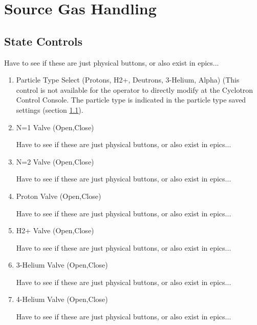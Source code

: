 \documentclass[11pt]{book}		%
\begin{document}
\section{Source Gas Handling}


\subsection{State Controls}

\color{red}
Have to see if these are just physical buttons, or also exist in epics...
\color{black}


\begin{enumerate}
 \item Particle Type Select (Protons, H2+, Deutrons, 3-Helium, Alpha) (This control is not available for the operator to directly modify at the Cyclotron Control Console.  The particle type is indicated in the particle type saved settings (section \ref{}).

\color{red}

\color{black}

 \item N=1 Valve (Open,Close)

\color{red}
Have to see if these are just physical buttons, or also exist in epics...
\color{black}

 \item N=2 Valve (Open,Close)

\color{red}
Have to see if these are just physical buttons, or also exist in epics...
\color{black}

 \item Proton Valve (Open,Close)

\color{red}
Have to see if these are just physical buttons, or also exist in epics...
\color{black}

 \item H2+ Valve (Open,Close)

\color{red}
Have to see if these are just physical buttons, or also exist in epics...
\color{black}

 \item 3-Helium Valve (Open,Close)

\color{red}
Have to see if these are just physical buttons, or also exist in epics...
\color{black}

 \item 4-Helium Valve (Open,Close)

\color{red}
Have to see if these are just physical buttons, or also exist in epics...
\color{black}


\end{enumerate}
\end{document}
